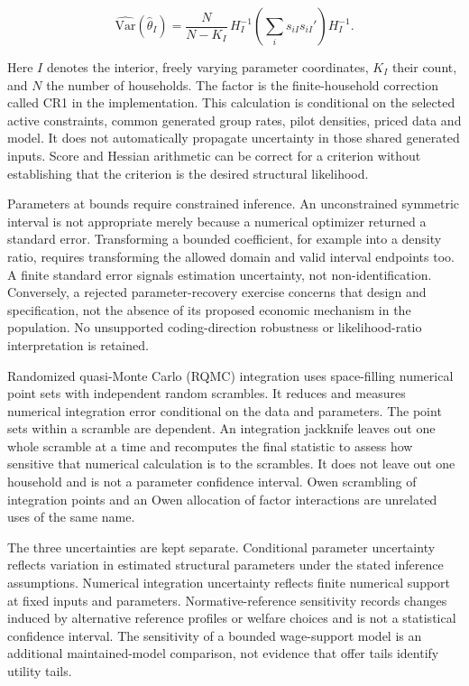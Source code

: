 \documentclass[11pt,a4paper]{article}
\begin{document}
\[\widehat{\mathrm{Var}}(\widehat\theta_I)=
\frac{N}{N-K_I}\,H_I^{-1}\left(\sum_i s_{iI}s_{iI}'\right)H_I^{-1}.\]

Here \(I\) denotes the interior, freely varying parameter coordinates, \(K_I\) their count, and \(N\) the number of households. The factor is the finite-household correction called CR1 in the implementation. This calculation is conditional on the selected active constraints, common generated group rates, pilot densities, priced data and model. It does not automatically propagate uncertainty in those shared generated inputs. Score and Hessian arithmetic can be correct for a criterion without establishing that the criterion is the desired structural likelihood.

Parameters at bounds require constrained inference. An unconstrained symmetric interval is not appropriate merely because a numerical optimizer returned a standard error. Transforming a bounded coefficient, for example into a density ratio, requires transforming the allowed domain and valid interval endpoints too. A finite standard error signals estimation uncertainty, not non-identification. Conversely, a rejected parameter-recovery exercise concerns that design and specification, not the absence of its proposed economic mechanism in the population. No unsupported coding-direction robustness or likelihood-ratio interpretation is retained.

Randomized quasi-Monte Carlo (RQMC) integration uses space-filling numerical point sets with independent random scrambles. It reduces and measures numerical integration error conditional on the data and parameters. The point sets within a scramble are dependent. An integration jackknife leaves out one whole scramble at a time and recomputes the final statistic to assess how sensitive that numerical calculation is to the scrambles. It does not leave out one household and is not a parameter confidence interval. Owen scrambling of integration points and an Owen allocation of factor interactions are unrelated uses of the same name.

The three uncertainties are kept separate. Conditional parameter uncertainty reflects variation in estimated structural parameters under the stated inference assumptions. Numerical integration uncertainty reflects finite numerical support at fixed inputs and parameters. Normative-reference sensitivity records changes induced by alternative reference profiles or welfare choices and is not a statistical confidence interval. The sensitivity of a bounded wage-support model is an additional maintained-model comparison, not evidence that offer tails identify utility tails.
\end{document}
